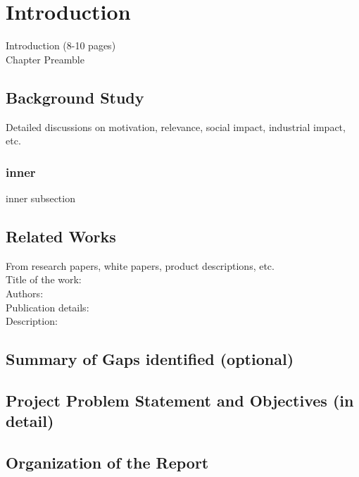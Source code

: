 \chapter{Introduction}
\graphicspath{{Introduction/IntroductionFigs/EPS/}{Introduction/IntroductionFigs/}}

Introduction (8-10 pages)\\
Chapter Preamble
\section{Background Study}
Detailed discussions on motivation, relevance, social impact, industrial impact, etc.
\subsection{inner}
	inner subsection
\section{Related Works}
From research papers, white papers, product descriptions, etc.\\
Title of the work:\\
Authors:\\
Publication details:\\
Description:
\section{Summary of Gaps identified (optional)}
\section{Project Problem Statement and Objectives (in detail)}
\section{Organization of the Report}  \cite{Mostafa:VC}


